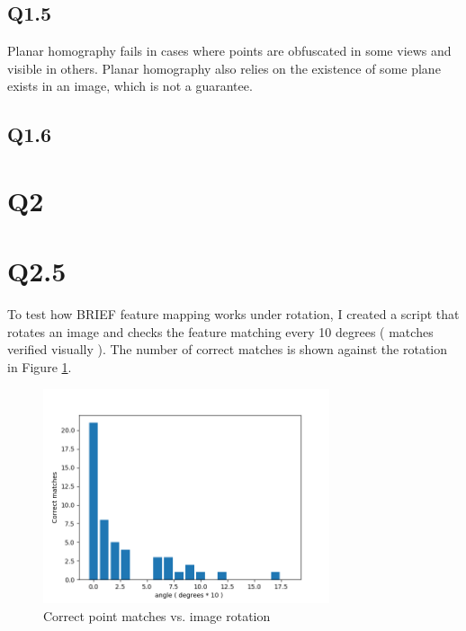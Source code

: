 \documentclass[12pt]{article}
\begin{document}
\subsection{Q1.5}
Planar homography fails in cases where points are obfuscated in some views and visible in others. Planar homography also relies on the existence of some plane exists in an image, which is not a guarantee.
\subsection{Q1.6}

\section{Q2}
\section{Q2.5}
To test how BRIEF feature mapping works under rotation, I created a script that rotates an image and checks the feature matching every 10 degrees ( matches verified visually ). The number of correct matches is shown against the rotation in Figure \ref{fig:imgrot}.
\begin{figure}[H]
\centering
\includegraphics[page=1,width=0.75\textwidth]{q2_5}
\caption{ Correct point matches vs. image rotation } 
\label{fig:imgrot}
\end{figure}   
\end{document}
